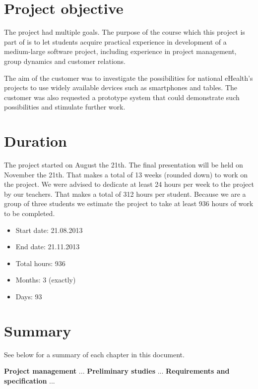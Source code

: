 
\section{Project objective}
\label{section:objective}

The project had multiple goals.
The purpose of the course which this project is part of is to let students acquire practical experience in development of a medium-large software project, including experience in project management, group dynamics and customer relations.

The aim of the customer was to investigate the possibilities for national eHealth's projects to use widely available devices such as smartphones and tables. The customer was also requested a prototype system that could demonstrate such possibilities and stimulate further work.

\section{Duration}
\label{section:duration}
The project started on August the 21th. The final presentation will be held on November the 21th. That makes a total of 13 weeks (rounded down) to work on the project. We were advised to dedicate at least 24 hours per week to the project by our teachers. %
That makes a total of 312 hours per student. Because we are a group of three students we estimate the project to take at least 936 hours of work to be completed.

\begin{itemize}
\item Start date: 21.08.2013
\item End date: 21.11.2013
\item Total hours: 936
\item Months: 3 (exactly)
\item Days: 93
\end{itemize}





\section{Summary}

See below for a summary of each chapter in this document.

\textbf{Project management}\newline
...
\textbf{Preliminary studies}\newline
...
\textbf{Requirements and specification}\newline
...
